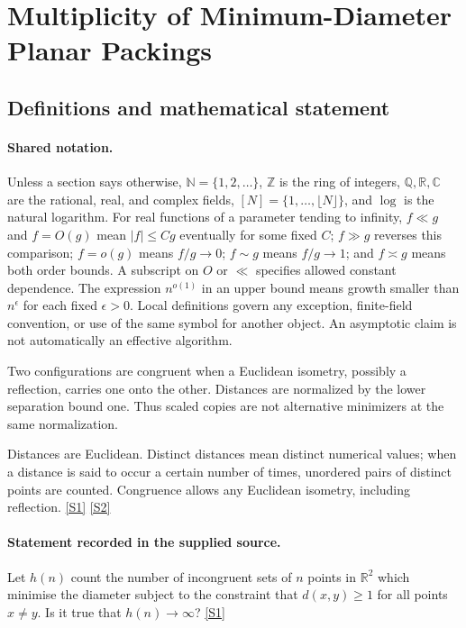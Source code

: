 \documentclass[11pt,a4paper]{article}
\newcommand{\N}{\mathbb{N}}
\newcommand{\Z}{\mathbb{Z}}
\newcommand{\Q}{\mathbb{Q}}
\newcommand{\R}{\mathbb{R}}
\newcommand{\C}{\mathbb{C}}
\newcommand{\sref}[2]{\hyperlink{source:#1:#2}{[S#2]}}
\begin{document}
\section{Multiplicity of Minimum-Diameter Planar Packings}\label{statement}


\subsection{Definitions and mathematical statement}

\paragraph{Shared notation.}Unless a section says otherwise, $\N=\{1,2,\ldots\}$,
$\Z$ is the ring of integers, $\Q,\R,\C$ are the rational, real, and complex
fields, $[N]=\{1,\ldots,\lfloor N\rfloor\}$, and $\log$ is the natural
logarithm. For real functions of a parameter tending to infinity,
$f\ll g$ and $f=O(g)$ mean $|f|\leq Cg$ eventually for some fixed $C$;
$f\gg g$ reverses this comparison; $f=o(g)$ means $f/g\to0$;
$f\sim g$ means $f/g\to1$; and $f\asymp g$ means both order bounds.
A subscript on $O$ or $\ll$ specifies allowed constant dependence.
The expression $n^{o(1)}$ in an upper bound means growth smaller than
$n^\epsilon$ for each fixed $\epsilon>0$. Local definitions govern any
exception, finite-field convention, or use of the same symbol for another
object. An asymptotic claim is not automatically an effective algorithm.



Two configurations are congruent when a Euclidean isometry, possibly a reflection, carries one onto the other. Distances are normalized by the lower separation bound one. Thus scaled copies are not alternative minimizers at the same normalization.

Distances are Euclidean. Distinct distances mean distinct numerical values; when a distance is said to occur a certain number of times, unordered pairs of distinct points are counted. Congruence allows any Euclidean isometry, including reflection. \sref{statement}{1} \sref{statement}{2}

\paragraph{Statement recorded in the supplied source.}
Let $h(n)$ count the number of incongruent sets of $n$ points in $\mathbb{R}^2$ which minimise the diameter subject to the constraint that $d(x,y)\geq 1$ for all points $x\neq y$. Is it true that $h(n)\to \infty$? \sref{statement}{1}
\end{document}
